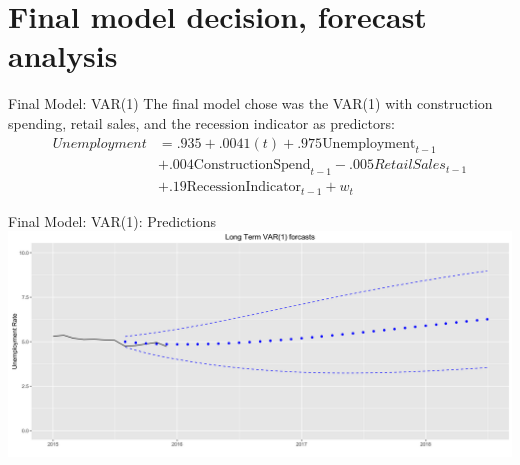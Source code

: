 \documentclass[ignorenonframetext]{beamer}
\begin{document}
 \section{Final model decision, forecast analysis}
  	\begin{frame}{Final Model: VAR(1)}
  		 The final model chose was the VAR(1) with construction spending, retail sales, and the recession indicator as predictors:
  \begin{align*}
  {Unemployment} & =.935 + .0041(t) + .975\text{Unemployment}_{t-1} \\
  &+ .004\text{ConstructionSpend}_{t-1} - .005 RetailSales_{t-1} \\
  &+ .19\text{RecessionIndicator}_{t-1}+ w_t
  \end{align*}
  	\end{frame}
 
  	\begin{frame}{Final Model: VAR(1): Predictions}
 \includegraphics[width=\textwidth]{images/zoomedvar}
  	\end{frame}
 
     
\end{document}
